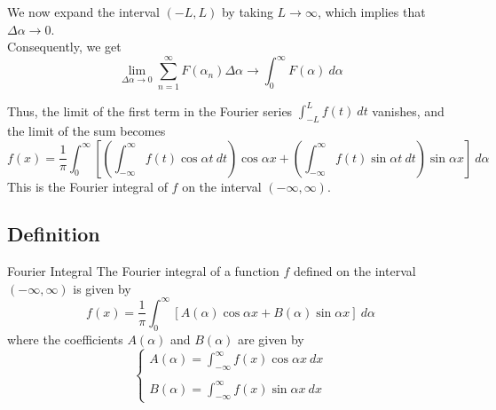 \documentclass[12pt]{article}
\begin{document}
We now expand the interval $(-L,L)$ by taking $L \to \infty$, which implies that $\Delta\alpha \to 0$.\\
Consequently, we get
\begin{equation}
    \lim_{\Delta\alpha \to 0} \sum_{n=1}^{\infty} F(\alpha_n)\Delta\alpha  \to \int_{0}^{\infty} {F(\alpha)} \: d{\alpha} 
\end{equation}

Thus, the limit of the first term in the Fourier series $\displaystyle \int_{-L}^{L} {f(t)} \: d{t}$ vanishes, and the limit of the sum becomes
\begin{equation}
    f(x) = \frac{1}{\pi} \int_{0}^{\infty} { \left[ \left( \int_{-\infty}^{\infty} {f(t) \cos{\alpha t}} \: d{t} \right) \cos{\alpha x} + \left( \int_{-\infty}^{\infty} {f(t) \sin{\alpha t}} \: d{t} \right) \sin{\alpha x} \right] } \: d{\alpha}
\end{equation}
This is the Fourier integral of $f$ on the interval $(-\infty,\infty)$.

\subsection{Definition}
\begin{definition}{Fourier Integral}{}
    The Fourier integral of a function $f$ defined on the interval $(-\infty,\infty)$ is given by
    \begin{equation}
        f(x) = \frac{1}{\pi} \int_{0}^{\infty} { \left[ A(\alpha) \cos{\alpha x} + B(\alpha) \sin{\alpha x} \right] } \: d{\alpha}
    \end{equation}
    where the coefficients $A(\alpha)$ and $B(\alpha)$ are given by
    \begin{equation}
        \begin{cases}
            \displaystyle A(\alpha) = \int_{-\infty}^{\infty} {f(x) \cos{\alpha x}} \: d{x} \\\\
            \displaystyle B(\alpha) = \int_{-\infty}^{\infty} {f(x) \sin{\alpha x}} \: d{x}
        \end{cases}
    \end{equation}
\end{definition}
\end{document}
